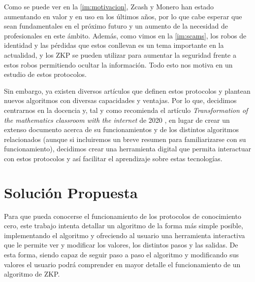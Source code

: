 Como se puede ver en la \autoref{im:motivacion}, Zcash y  Monero han estado aumentando en valor y en uso en los últimos años, por lo que cabe esperar que sean fundamentales en el próximo futuro y un aumento de la necesidad de profesionales en este ámbito. Además, como vimos en la \autoref{im:scams}, los robos de identidad y las pérdidas que estos conllevan es un tema importante en la actualidad, y los ZKP se pueden utilizar para aumentar la seguridad frente a estos robos permitiendo ocultar la información. Todo esto nos motiva en un estudio de estos protocolos.

Sin embargo, ya existen diversos artículos que definen estos protocolos y plantean nuevos algoritmos con diversas capacidades y ventajas. Por lo que, decidimos centrarnos en la docencia y, tal y como recomienda el artículo \emph{Transformation of the mathematics classroom with the internet} de 2020 \cite{Maths}, en lugar de crear un extenso documento acerca de su funcionamientos y de los distintos algoritmos relacionados (aunque si incluiremos un breve resumen para familiarizarse con su funcionamiento), decidimos crear una herramienta digital que permita interactuar con estos protocolos y así facilitar el aprendizaje sobre estas tecnologías.

\section{Solución Propuesta}

Para que pueda conocerse el funcionamiento de los protocolos de conocimiento cero, este trabajo intenta detallar un algoritmo de la forma más simple posible, implementando el algoritmo y ofreciendo al usuario una herramienta interactiva que le permite ver y modificar los valores, los distintos pasos y las salidas. De esta forma, siendo capaz de seguir paso a paso el algoritmo y modificando sus valores el usuario podrá comprender en mayor detalle el funcionamiento de un algoritmo de ZKP.

